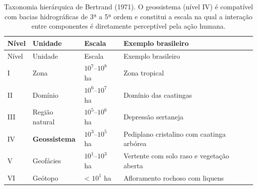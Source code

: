 \documentclass[
  portuguese,
  11pt,
  a4paper,
  open=any]{scrbook}
\begin{document}
\begin{longtable}[]{@{}
  >{\centering\arraybackslash}p{}
  >{\raggedright\arraybackslash}p{}
  >{\centering\arraybackslash}p{}
  >{\raggedright\arraybackslash}p{}@{}}
\caption{Taxonomia hierárquica de Bertrand (1971). O geossistema (nível
IV) é compatível com bacias hidrográficas de 3ª a 5ª ordem e constitui a
escala na qual a interação entre componentes é diretamente perceptível
pela ação humana.}\label{tbl-bertrand-taxon}\tabularnewline
\toprule\noalign{}
\begin{minipage}[b]{\linewidth}\centering
Nível
\end{minipage} & \begin{minipage}[b]{\linewidth}\raggedright
Unidade
\end{minipage} & \begin{minipage}[b]{\linewidth}\centering
Escala
\end{minipage} & \begin{minipage}[b]{\linewidth}\raggedright
Exemplo brasileiro
\end{minipage} \\
\midrule\noalign{}
\endfirsthead
\toprule\noalign{}
\begin{minipage}[b]{\linewidth}\centering
Nível
\end{minipage} & \begin{minipage}[b]{\linewidth}\raggedright
Unidade
\end{minipage} & \begin{minipage}[b]{\linewidth}\centering
Escala
\end{minipage} & \begin{minipage}[b]{\linewidth}\raggedright
Exemplo brasileiro
\end{minipage} \\
\midrule\noalign{}
\endhead
\bottomrule\noalign{}
\endlastfoot
I & Zona & \(10^7\)--\(10^8\) ha & Zona tropical \\
II & Domínio & \(10^6\)--\(10^7\) ha & Domínio das caatingas \\
III & Região natural & \(10^5\)--\(10^6\) ha & Depressão sertaneja \\
IV & \textbf{Geossistema} & \(10^3\)--\(10^5\) ha & Pediplano cristalino
com caatinga arbórea \\
V & Geofácies & \(10^1\)--\(10^3\) ha & Vertente com solo raso e
vegetação aberta \\
VI & Geótopo & \textless{} \(10^1\) ha & Afloramento rochoso com
liquens \\
\end{longtable}
\end{document}
